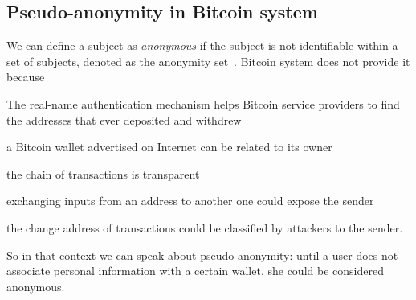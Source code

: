 \subsection{Pseudo-anonymity in Bitcoin system}
We can define a subject as \textit{anonymous} if the subject is not identifiable
within a set of subjects, denoted as the anonymity
set~\cite{bib:terminology}. Bitcoin system does not provide it
because~\cite{bib:deanon}
\begin{enumerate*}[label=\roman*),itemjoin={,\quad}]
\item The real-name authentication mechanism helps Bitcoin service
providers to find the addresses that ever deposited and withdrew
\item a Bitcoin wallet advertised on Internet can be related to its
owner
\item the chain of transactions is transparent
\item exchanging inputs from an address to another one could expose the
sender
\item the change address of transactions could be classified by
attackers to the sender.
\end{enumerate*}
So in that context we can speak about pseudo-anonymity: until a user
does not associate personal information with a certain wallet, she
could be considered anonymous.
